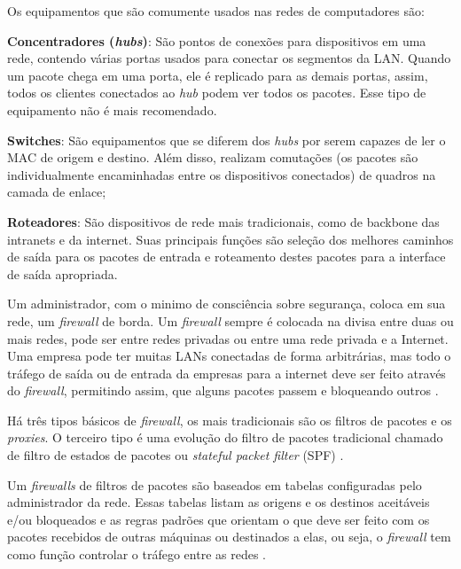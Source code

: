 Os equipamentos que são comumente usados nas redes de computadores são:

\begin{alineas}
\item \textbf{Concentradores (\textit{hubs})}: São pontos de conexões para dispositivos em uma rede, contendo várias portas usados para conectar os segmentos da LAN. Quando um pacote chega em uma porta, ele é replicado para as demais portas, assim, todos os clientes conectados ao \textit{hub} podem ver todos os pacotes. Esse tipo de equipamento não é mais recomendado.
\item \textbf{Switches}: São equipamentos que se diferem dos \textit{hubs} por serem capazes de ler o MAC de origem e destino. Além disso, realizam comutações (os pacotes são individualmente encaminhadas entre os dispositivos conectados) de quadros na camada de enlace;
\item \textbf{Roteadores}: São dispositivos de rede mais tradicionais, como de backbone das intranets e da internet. Suas principais funções são seleção dos melhores caminhos de saída para os pacotes de entrada e roteamento destes pacotes para a interface de saída apropriada.
\end{alineas}

Um administrador, com o minimo de consciência sobre segurança, coloca em sua rede, um \textit{firewall} de borda. Um \textit{firewall} sempre é colocada na divisa entre duas ou mais redes, pode ser entre redes privadas ou entre uma rede privada e a Internet. Uma empresa pode ter muitas LANs conectadas de forma arbitrárias, mas todo o tráfego de saída ou de entrada da empresas para a internet deve ser feito através do \textit{firewall}, permitindo assim, que alguns pacotes passem e bloqueando outros \cite{redesdecomputadores}.

Há três tipos básicos de \textit{firewall}, os mais tradicionais são os filtros de pacotes e os \textit{proxies}. O terceiro tipo é uma evolução do filtro de pacotes tradicional chamado de filtro de estados de pacotes ou \textit{stateful packet filter} (SPF) \cite{univhacker}.

Um \textit{firewalls} de filtros de pacotes são baseados em tabelas configuradas pelo administrador da rede. Essas tabelas listam as origens e os destinos aceitáveis e/ou bloqueados e as regras padrões que orientam o que deve ser feito com os pacotes recebidos de outras máquinas ou destinados a elas, ou seja, o \textit{firewall} tem como função controlar o tráfego entre as redes \cite{redesdecomputadores}. 

